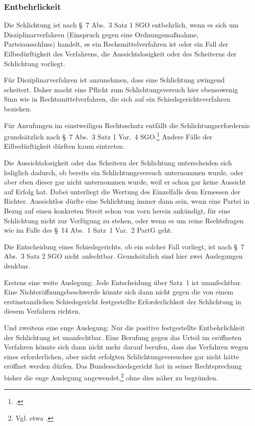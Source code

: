 \subsubsection{Entbehrlickeit}
\label{Anrufung:Kriterien:Schlichtung:Entbehrlickeit}
Die Schlichtung ist nach \S~7 Abs.~3 Satz 1 SGO entbehrlich, wenn es sich um Disziplinarverfahren (Einspruch gegen eine Ordnungsmaßnahme, Parteiausschluss) handelt, es ein Rechsmittelverfahren ist oder ein Fall der Eilbedürftigkeit des Verfahrens, die Aussichtslosigkeit oder des Scheiterns der Schlichtung vorliegt.

Für Disziplinarverfahren ist anzunehmen, dass eine Schlichtung zwingend scheitert. Daher macht eine Pflicht zum Schlichtungsversuch hier ebensowenig Sinn wie in Rechtsmittelverfahren, die sich auf ein Schiedsgerichtsverfahren beziehen. 

Für Anrufungen im einstweiligen Rechtsschutz entfällt die Schlichtungserfordernis grundsätzlich nach  \S~7 Abs.~3 Satz 1 Var.~4 SGO.\footnote{\cites[3]{BSG20131210}{BSG3014HS}.}
Andere Fälle der Eilbedürftigkeit dürften kaum eintreten.

Die Aussichtslosigkeit oder das Scheitern der Schlichtung unterscheiden sich lediglich dadurch, ob bereits ein Schlichtungsversuch unternommen wurde, oder aber eben dieser gar nicht unternommen wurde, weil er schon gar keine Aussicht auf Erfolg hat. Dabei unterliegt die Wertung des Einzelfalls dem Ermessen der Richter. Aussichtlos dürfte eine Schlichtung immer dann sein, wenn eine Partei in Bezug auf einen konkreten Streit schon von vorn herein ankündigt, für eine Schlichtung nicht zur Verfügung zu stehen, oder wenn es um reine Rechtsfragen wie im Falle des \S~14 Abs.~1 Satz~1 Var.~2 PartG geht.

Die Entscheidung eines Schiedsgerichts, ob ein solcher Fall vorliegt, ist nach \S~7 Abs.~3 Satz 2 SGO nicht anfechtbar.
Grundsätzlich sind hier zwei Auslegungen denkbar.

Erstens eine weite Auslegung:
Jede Entscheidung über Satz~1 ist unanfechtbar.
Eine Nichteröffnungsbeschwerde könnte sich dann nicht gegen die von einem erstinstanzlichen Schiedsgericht festgestellte Erforderlichkeit der Schlichtung in diesem Verfahren richten.

Und zweitens eine enge Auslegung:
Nur die positive festgestellte Entbehrlichkeit der Schlichtung ist unanfechtbar.
Eine Berufung gegen das Urteil im eröffneten Verfahren könnte sich dann nicht mehr darauf berufen, dass das Verfahren wegen eines erforderlichen, aber nicht erfolgten Schlichtungsversuches gar nicht hätte eröffnet werden dürfen.
Das Bundesschiedsgericht hat in seiner Rechtsprechung bisher die enge Auslegung angewendet,\footnote{Vgl. etwa \cites{BSG914H1}{BSG3014HS}.} ohne dies näher zu begründen.

